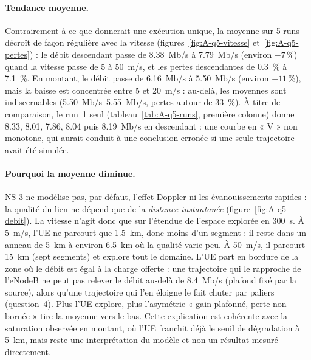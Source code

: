 \paragraph{Tendance moyenne.} Contrairement à ce que donnerait une exécution
unique, la moyenne sur 5 runs décroît de façon régulière avec la vitesse
(figures~\ref{fig:A-q5-vitesse} et~\ref{fig:A-q5-pertes}) : le débit descendant
passe de \SI{8.38}{Mb/s} à \SI{7.79}{Mb/s} (environ $-7\,\%$) quand la vitesse
passe de 5 à \SI{50}{m/s}, et les pertes descendantes de \SI{0.3}{\%} à
\SI{7.1}{\%}. En montant, le débit passe de \SI{6.16}{Mb/s} à \SI{5.50}{Mb/s}
(environ $-11\,\%$), mais la baisse est concentrée entre 5 et \SI{20}{m/s} : au-delà,
les moyennes sont indiscernables (\SIrange{5.50}{5.55}{Mb/s}, pertes autour de
\SI{33}{\%}). À titre de comparaison, le run~1 seul
(tableau~\ref{tab:A-q5-runs}, première colonne) donne
\num{8.33}, \num{8.01}, \num{7.86}, \num{8.04} puis \SI{8.19}{Mb/s} en
descendant : une courbe en « V » non monotone, qui aurait conduit à une
conclusion erronée si une seule trajectoire avait été simulée.

\paragraph{Pourquoi la moyenne diminue.} NS-3 ne modélise pas, par défaut,
l'effet Doppler ni les évanouissements rapides : la qualité du lien ne dépend
que de la \emph{distance instantanée} (figure~\ref{fig:A-q5-debit}). La
vitesse n'agit donc que sur l'étendue de l'espace explorée en \SI{300}{s}. À
\SI{5}{m/s}, l'UE ne parcourt que \SI{1.5}{km}, donc moins d'un segment : il
reste dans un anneau de \SI{5}{km} à environ \SI{6.5}{km} où la qualité varie
peu. À \SI{50}{m/s}, il parcourt \SI{15}{km} (sept segments) et explore tout le
domaine. L'UE part en bordure de la zone où le débit est égal à la charge
offerte : une trajectoire qui le rapproche de l'eNodeB ne peut pas relever le
débit au-delà de \SI{8.4}{Mb/s} (plafond fixé par la source), alors qu'une
trajectoire qui l'en éloigne le fait chuter par paliers (question~4). Plus
l'UE explore, plus l'asymétrie « gain plafonné, perte non bornée » tire la
moyenne vers le bas. Cette explication est cohérente avec la saturation observée
en montant, où l'UE franchit déjà le seuil de dégradation à \SI{5}{km}, mais
reste une interprétation du modèle et non un résultat mesuré directement.

